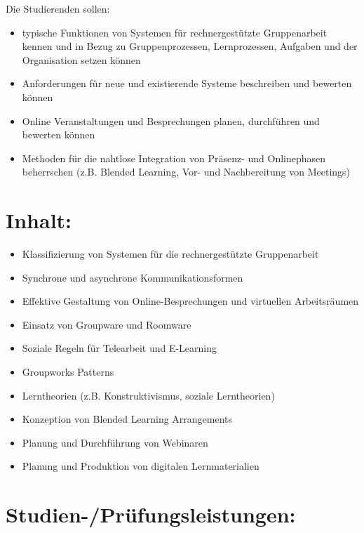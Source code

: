 Die Studierenden sollen:

\begin{itemize}
\tightlist
\item
  typische Funktionen von Systemen für rechnergestützte Gruppenarbeit
  kennen und in Bezug zu Gruppenprozessen, Lernprozessen, Aufgaben und
  der Organisation setzen können
\item
  Anforderungen für neue und existierende Systeme beschreiben und
  bewerten können
\item
  Online Veranstaltungen und Besprechungen planen, durchführen und
  bewerten können
\item
  Methoden für die nahtlose Integration von Präsenz- und Onlinephasen
  beherrschen (z.B. Blended Learning, Vor- und Nachbereitung von
  Meetings)
\end{itemize}

\section*{Inhalt:\label{/mi-2017/modulbeschreibungen-master/MA_SC_WPF_CSCL}}\label{inhaltpathlabelmi-2017modulbeschreibungen-mastermaux5fscux5fwpfux5fcscl}

\begin{itemize}
\tightlist
\item
  Klassifizierung von Systemen für die rechnergestützte Gruppenarbeit
\item
  Synchrone und asynchrone Kommunikationsformen
\item
  Effektive Gestaltung von Online-Besprechungen und virtuellen
  Arbeitsräumen
\item
  Einsatz von Groupware und Roomware
\item
  Soziale Regeln für Telearbeit und E-Learning
\item
  Groupworks Patterns
\item
  Lerntheorien (z.B. Konstruktivismus, soziale Lerntheorien)
\item
  Konzeption von Blended Learning Arrangements
\item
  Planung und Durchführung von Webinaren
\item
  Planung und Produktion von digitalen Lernmaterialien
\end{itemize}

\section*{Studien-/Prüfungsleistungen:\label{/mi-2017/modulbeschreibungen-master/MA_SC_WPF_CSCL}}\label{studien-pruxfcfungsleistungenpathlabelmi-2017modulbeschreibungen-mastermaux5fscux5fwpfux5fcscl}

